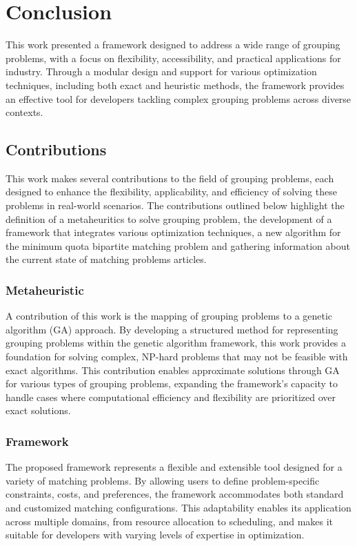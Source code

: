 \chapter{Conclusion} \label{chap:conclusion}

This work presented a framework designed to address a wide range of grouping problems, with a focus on flexibility, accessibility, and practical applications for industry.
Through a modular design and support for various optimization techniques, including both exact and heuristic methods, the framework provides an effective tool for developers tackling complex grouping problems across diverse contexts.

\section{Contributions}
    This work makes several contributions to the field of grouping problems, each designed to enhance the flexibility, applicability, and efficiency of solving these problems in real-world scenarios. The contributions outlined below highlight the definition of a metaheuritics to solve grouping problem, the development of a framework that integrates various optimization techniques, a new algorithm for the minimum quota bipartite matching problem and gathering information about the current state of matching problems articles.
    \subsection{Metaheuristic}
    A contribution of this work is the mapping of grouping problems to a genetic algorithm (GA) approach. By developing a structured method for representing grouping problems within the genetic algorithm framework, this work provides a foundation for solving complex, NP-hard problems that may not be feasible with exact algorithms. This contribution enables approximate solutions through GA for various types of grouping problems, expanding the framework's capacity to handle cases where computational efficiency and flexibility are prioritized over exact solutions.


    \subsection{Framework}
        The proposed framework represents a flexible and extensible tool designed for a variety of matching problems. By allowing users to define problem-specific constraints, costs, and preferences, the framework accommodates both standard and customized matching configurations. This adaptability enables its application across multiple domains, from resource allocation to scheduling, and makes it suitable for developers with varying levels of expertise in optimization.
    
